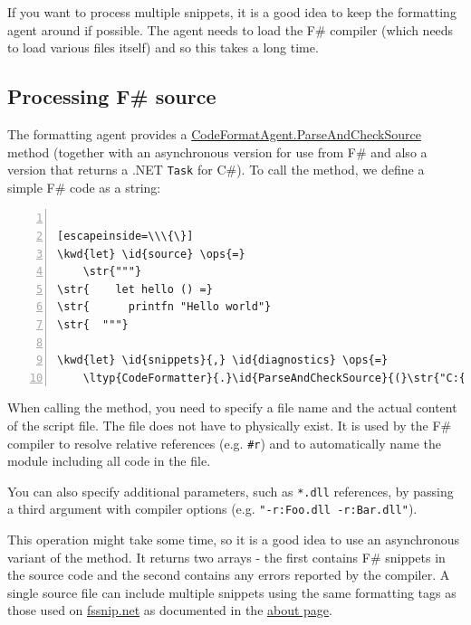 \documentclass{article}
\newcommand{\id}[1]{\textcolor{black}{#1}}
\newcommand{\kwd}[1]{\textcolor{navy}{#1}}
\newcommand{\ops}[1]{\textcolor{purple}{#1}}
\newcommand{\str}[1]{\textcolor{olive}{#1}}
\begin{document}
If you want to process multiple snippets, it is a good idea to keep the
formatting agent around if possible. The agent needs to load the F\# compiler
(which needs to load various files itself) and so this takes a long time.
\subsection*{Processing F\# source}



The formatting agent provides a \href{https://fsharp.github.io/fsharp-core-docs/reference/fsharp-formatting-codeformat-codeformatagent\#ParseAndCheckSource}{CodeFormatAgent.ParseAndCheckSource} method (together with an asynchronous
version for use from F\# and also a version that returns a .NET \texttt{Task} for C\#).
To call the method, we define a simple F\# code as a string:
\begin{lstlisting}[numbers=left]

[escapeinside=\\\{\}]
\kwd{let} \id{source} \ops{=}
    \str{"""}
\str{    let hello () =}
\str{      printfn "Hello world"}
\str{  """}

\kwd{let} \id{snippets}{,} \id{diagnostics} \ops{=}
    \ltyp{CodeFormatter}{.}\id{ParseAndCheckSource}{(}\str{"C:{\textbackslash}{\textbackslash}snippet.fsx"}{,} \id{source}{,} {None}{,} {None}{,} \lfun{ignore}{)}

\end{lstlisting}



When calling the method, you need to specify a file name and the actual content
of the script file. The file does not have to physically exist. It is used by the
F\# compiler to resolve relative references (e.g. \texttt{\#r}) and to automatically name
the module including all code in the file.


You can also specify additional parameters, such as \texttt{*.dll} references, by passing
a third argument with compiler options (e.g. \texttt{"-r:Foo.dll -r:Bar.dll"}).


This operation might take some time, so it is a good idea to use an asynchronous
variant of the method. It returns two arrays - the first contains F\# snippets
in the source code and the second contains any errors reported by the compiler.
A single source file can include multiple snippets using the same formatting tags
as those used on \href{http://www.fssnip.net}{fssnip.net} as documented in the
\href{http://www.fssnip.net/pages/About}{about page}.
\end{document}
